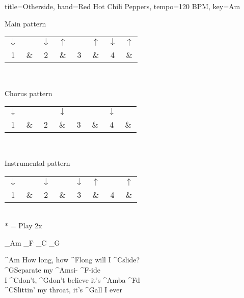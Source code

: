 \documentclass[titlepage]{article}
\begin{document}
\begin{song}{title=Otherside, band=Red Hot Chili Peppers, tempo=120 BPM, key=Am}
	\begin{center}
		Main pattern \\
		\begin{tabular}{cccccccc}
			$\downarrow$ & $\quad$ & $\downarrow$ & $\uparrow$ & $\quad$ & $\uparrow$ & $\downarrow$ & $\uparrow$ \\
			1            & \&      & 2            & \&         & 3       & \&         & 4            & \&         \\
		\end{tabular} \\

	\end{center}
	\begin{center}
		Chorus pattern                                                                               \\
		\begin{tabular}{cccccccc}
			$\downarrow$ & $\quad$ & $\quad$ & $\downarrow$ & $\quad$ & $\quad$ & $\downarrow$ & $\quad$ \\
			1            & \&      & 2       & \&           & 3       & \&      & 4            & \&      \\
		\end{tabular} \\

	\end{center}
	\begin{center}
		Instrumental pattern \\
		\begin{tabular}{cccccccc}
			$\downarrow$ & $\quad$ & $\downarrow$ & $\quad$ & $\downarrow$ & $\uparrow$ & $\quad$ & $\uparrow$ \\
			1            & \&      & 2            & \&      & 3            & \&         & 4       & \&         \\
		\end{tabular} \\

		* = Play 2x
	\end{center}

	\begin{intro}
		_{Am} _{F} _{C} _{G}
	\end{intro}

	\begin{chorus}
		^{Am}{ } How long, how ^{F}long will I ^{C}slide? \\
		^{G}Separate my ^{Am}si- ^{F}-ide \\
		I ^{C}don't, ^{G}don't believe it's ^{Am}ba ^{F}d \\
		^{C}Slittin' my throat, it's ^{G}all I ever
	\end{chorus}


\end{song}
\end{document}
